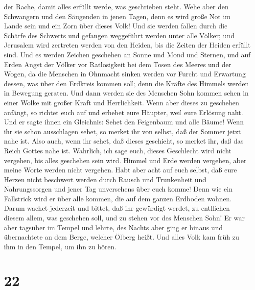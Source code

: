 der Rache, damit alles erfüllt werde, was geschrieben steht.
 Wehe aber den Schwangern und den Säugenden in jenen
Tagen, denn es wird große Not im Lande sein und ein Zorn über dieses
Volk!  Und sie werden fallen durch die Schärfe des
Schwerts und gefangen weggeführt werden unter alle Völker; und Jerusalem
wird zertreten werden von den Heiden, bis die Zeiten der Heiden erfüllt
sind.  Und es werden Zeichen geschehen an Sonne und Mond
und Sternen, und auf Erden Angst der Völker vor Ratlosigkeit bei dem
Tosen des Meeres und der Wogen,  da die Menschen in
Ohnmacht sinken werden vor Furcht und Erwartung dessen, was über den
Erdkreis kommen soll; denn die Kräfte des Himmels werden in Bewegung
geraten.  Und dann werden sie des Menschen Sohn kommen
sehen in einer Wolke mit großer Kraft und Herrlichkeit. 
Wenn aber dieses zu geschehen anfängt, so richtet euch auf und erhebet
eure Häupter, weil eure Erlösung naht.  Und er sagte
ihnen ein Gleichnis: Sehet den Feigenbaum und alle Bäume!
 Wenn ihr sie schon ausschlagen sehet, so merket ihr von
selbst, daß der Sommer jetzt nahe ist.  Also auch, wenn
ihr sehet, daß dieses geschieht, so merket ihr, daß das Reich Gottes
nahe ist.  Wahrlich, ich sage euch, dieses Geschlecht
wird nicht vergehen, bis alles geschehen sein wird. 
Himmel und Erde werden vergehen, aber meine Worte werden nicht vergehen.
 Habt aber acht auf euch selbst, daß eure Herzen nicht
beschwert werden durch Rausch und Trunkenheit und Nahrungssorgen und
jener Tag unversehens über euch komme!  Denn wie ein
Fallstrick wird er über alle kommen, die auf dem ganzen Erdboden wohnen.
 Darum wachet jederzeit und bittet, daß ihr gewürdigt
werdet, zu entfliehen diesem allem, was geschehen soll, und zu stehen
vor des Menschen Sohn!  Er war aber tagsüber im Tempel
und lehrte, des Nachts aber ging er hinaus und übernachtete an dem
Berge, welcher Ölberg heißt.  Und alles Volk kam früh zu
ihm in den Tempel, um ihn zu hören.

\hypertarget{section-21}{%
\section{22}\label{section-21}}

